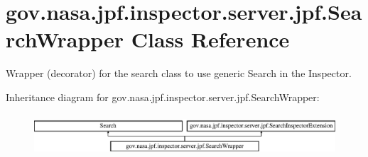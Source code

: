 \hypertarget{classgov_1_1nasa_1_1jpf_1_1inspector_1_1server_1_1jpf_1_1_search_wrapper}{}\section{gov.\+nasa.\+jpf.\+inspector.\+server.\+jpf.\+Search\+Wrapper Class Reference}
\label{classgov_1_1nasa_1_1jpf_1_1inspector_1_1server_1_1jpf_1_1_search_wrapper}


Wrapper (decorator) for the search class to use generic Search in the Inspector.  


Inheritance diagram for gov.\+nasa.\+jpf.\+inspector.\+server.\+jpf.\+Search\+Wrapper\+:\begin{figure}[H]
\begin{center}
\leavevmode
\includegraphics[height=1.573034cm]{classgov_1_1nasa_1_1jpf_1_1inspector_1_1server_1_1jpf_1_1_search_wrapper}
\end{center}
\end{figure}
